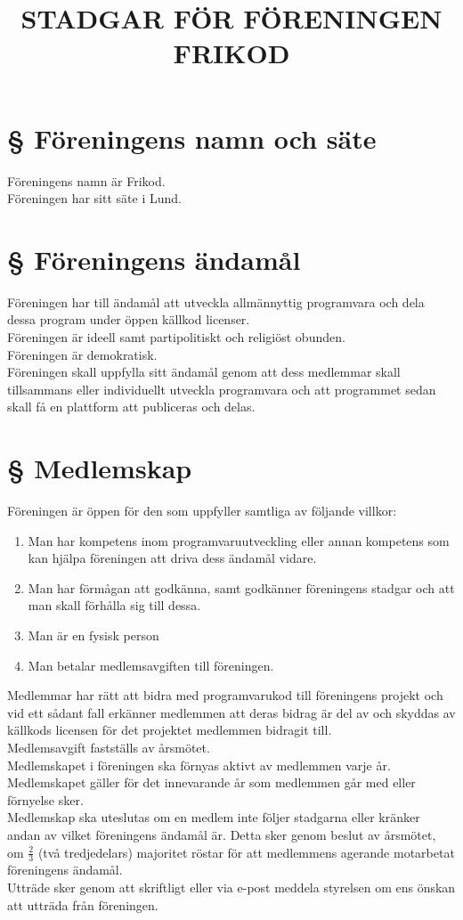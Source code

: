 \documentclass{article}
\title{STADGAR FÖR FÖRENINGEN FRIKOD}
\author{ }
\date{ }
\begin{document}
\maketitle

\section{§ Föreningens namn och säte}
Föreningens namn är Frikod.\\
Föreningen har sitt säte i Lund.

\section{§ Föreningens ändamål}
Föreningen har till ändamål att utveckla allmännyttig programvara och dela dessa program under öppen källkod licenser.\\
Föreningen är ideell samt partipolitiskt och religiöst obunden.\\
Föreningen är demokratisk.\\
Föreningen skall uppfylla sitt ändamål genom att dess medlemmar skall tillsammans eller individuellt utveckla programvara och att programmet sedan skall få en plattform att publiceras och delas.

\section{§ Medlemskap}
Föreningen är öppen för den som uppfyller samtliga av följande villkor:
\begin{enumerate}
  \item Man har kompetens inom programvaruutveckling eller annan kompetens som kan hjälpa föreningen att driva dess ändamål vidare.
  \item Man har förmågan att godkänna, samt godkänner föreningens stadgar och att man skall förhålla sig till dessa.
  \item Man är en fysisk person
  \item Man betalar medlemsavgiften till föreningen.
\end{enumerate}
Medlemmar har rätt att bidra med programvarukod till föreningens projekt och vid ett sådant fall erkänner medlemmen att deras bidrag är del av och skyddas av källkods licensen för det projektet medlemmen bidragit till.\\
Medlemsavgift fastställs av årsmötet.\\
Medlemskapet i föreningen ska förnyas aktivt av medlemmen varje år. Medlemskapet gäller för det innevarande år som medlemmen går med eller förnyelse sker.\\
Medlemskap ska uteslutas om en medlem inte följer stadgarna eller kränker andan av vilket föreningens ändamål är. Detta sker genom beslut av årsmötet, om $\frac{2}{3}$ (två tredjedelars) majoritet röstar för att medlemmens agerande motarbetat föreningens ändamål.  \\
Utträde sker genom att skriftligt eller via e-post meddela styrelsen om ens önskan att utträda från föreningen.
\end{document}
